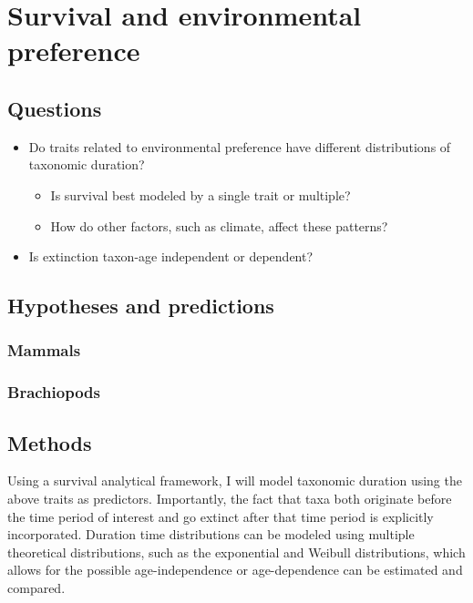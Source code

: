 \documentclass[12pt,letterpaper]{article}
\begin{document}
\section{Survival and environmental preference}
\subsection{Questions}
\begin{itemize}
  \item Do traits related to environmental preference have different distributions of taxonomic duration?
    \begin{itemize}
      \item Is survival best modeled by a single trait or multiple?
      \item How do other factors, such as climate, affect these patterns?
    \end{itemize}
  \item Is extinction taxon-age independent or dependent?
\end{itemize}

\subsection{Hypotheses and predictions}
\subsubsection{Mammals}
\subsubsection{Brachiopods}

\subsection{Methods}
Using a survival analytical framework, I will model taxonomic duration using the above traits as predictors. Importantly, the fact that taxa both originate before the time period of interest and go extinct after that time period is explicitly incorporated. Duration time distributions can be modeled using multiple theoretical distributions, such as the exponential and Weibull distributions, which allows for the possible age-independence or age-dependence can be estimated and compared.

\end{document}
